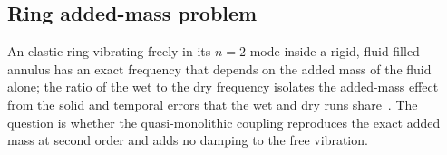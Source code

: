 
\subsection{Ring added-mass problem}\label{sec:ring_m}

An elastic ring vibrating freely in its $n = 2$ mode inside a rigid, fluid-filled annulus has an exact frequency that depends on the added mass of the fluid alone; the ratio of the wet to the dry frequency isolates the added-mass effect from the solid and temporal errors that the wet and dry runs share~\citep{CardiffFSIVerification2026}.
The question is whether the quasi-monolithic coupling reproduces the exact added mass at second order and adds no damping to the free vibration.

